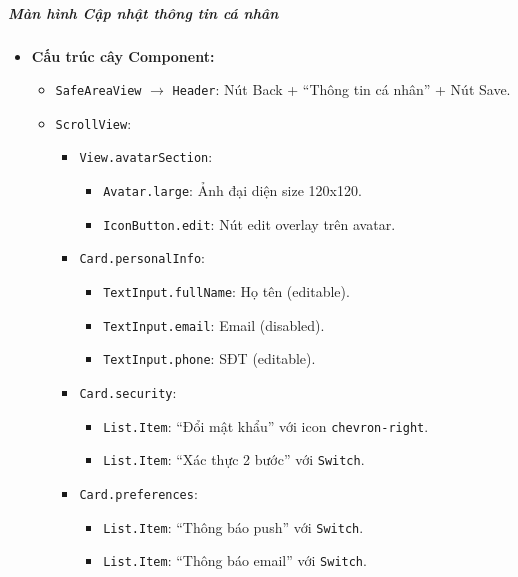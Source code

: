 \subparagraph{Màn hình Cập nhật thông tin cá nhân}
\begin{itemize}
    \item \textbf{Cấu trúc cây Component:}
        \begin{itemize}
            \item \texttt{SafeAreaView} $\rightarrow$ \texttt{Header}: Nút Back + ``Thông tin cá nhân'' + Nút Save.
            \item \texttt{ScrollView}:
                \begin{itemize}
                    \item \texttt{View.avatarSection}:
                        \begin{itemize}
                            \item \texttt{Avatar.large}: Ảnh đại diện size 120x120.
                            \item \texttt{IconButton.edit}: Nút edit overlay trên avatar.
                        \end{itemize}
                    \item \texttt{Card.personalInfo}:
                        \begin{itemize}
                            \item \texttt{TextInput.fullName}: Họ tên (editable).
                            \item \texttt{TextInput.email}: Email (disabled).
                            \item \texttt{TextInput.phone}: SĐT (editable).
                        \end{itemize}
                    \item \texttt{Card.security}:
                        \begin{itemize}
                            \item \texttt{List.Item}: ``Đổi mật khẩu'' với icon \texttt{chevron-right}.
                            \item \texttt{List.Item}: ``Xác thực 2 bước'' với \texttt{Switch}.
                        \end{itemize}
                    \item \texttt{Card.preferences}:
                        \begin{itemize}
                            \item \texttt{List.Item}: ``Thông báo push'' với \texttt{Switch}.
                            \item \texttt{List.Item}: ``Thông báo email'' với \texttt{Switch}.

\end{itemize}
\end{itemize}
\end{itemize}
\end{itemize}
